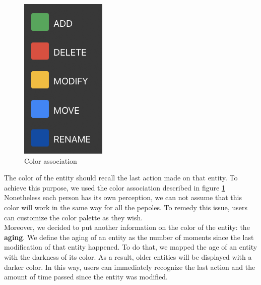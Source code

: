 \begin{figure}
    \begin{center}
        \includegraphics[width=0.7\linewidth]{ColorAssociation.png} 
        \caption{Color association}
        \label{fig:ColorAssociation}
    \end{center}
\end{figure}

The color of the entity should recall the last action made on that entity. To achieve this purpose, we used the color association described in figure \ref{fig:ColorAssociation}
Nonetheless each person has its own perception, we can not assume that this color will work in the same way for all the pepoles.
To remedy this issue, users can customize the color palette as they wish. \\

Moreover, we decided to put another information on the color of the entity: the \textbf{aging}. 
We define the aging of an entity as the number of moments since the last modification of that entity happened.
To do that, we mapped the age of an entity with the darkness of its color. 
As a result, older entities will be displayed with a darker color. 
In this way, users can immediately recognize the last action and the amount of time passed since the entity was modified.



